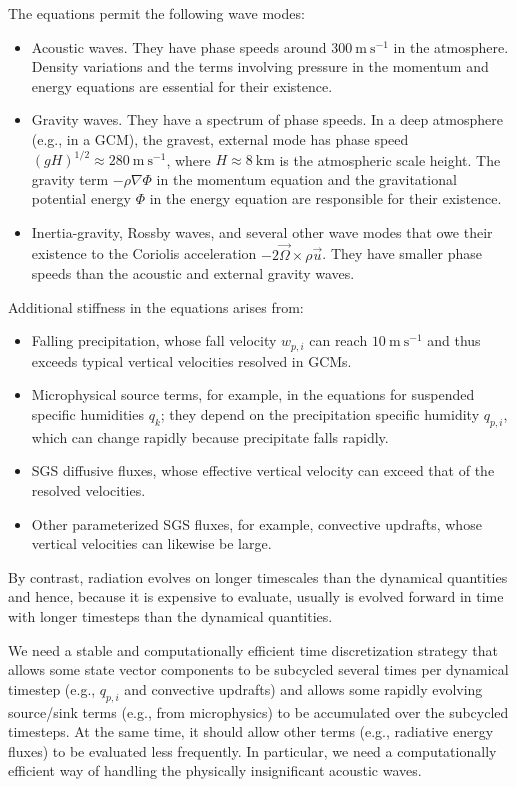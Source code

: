 \documentclass{report}
\numberwithin{equation}{section}
\begin{document}
The equations permit the following wave modes:
\begin{itemize}
    \item Acoustic waves. They have phase speeds around $300~\mathrm{m~s^{-1}}$ in the atmosphere. Density variations and the terms involving pressure in the momentum and energy equations are essential for their existence.
    \item Gravity waves. They have a spectrum of phase speeds. In a deep atmosphere (e.g., in a GCM), the gravest, external mode has phase speed $(gH)^{1/2} \approx 280~\mathrm{m~s^{-1}}$, where $H\approx 8~\mathrm{km}$ is the atmospheric scale height. The gravity term $-\rho \nabla \Phi$ in the momentum equation and the gravitational potential energy $\Phi$ in the energy equation are responsible for their existence.
    \item Inertia-gravity, Rossby waves, and several other wave modes that owe their existence to the Coriolis acceleration $-2\vec{\Omega} \times \rho \vec{u}$. They have smaller phase speeds than the acoustic and external gravity waves.
\end{itemize}
Additional stiffness in the equations arises from:
\begin{itemize}
    \item Falling precipitation, whose fall velocity $w_{p,i}$ can reach $10~\mathrm{m~s^{-1}}$ and thus exceeds typical vertical velocities resolved in GCMs.
    \item Microphysical source terms, for example, in the equations for suspended specific humidities $q_k$; they depend on the precipitation specific humidity $q_{p,i}$, which can change rapidly because precipitate falls rapidly. 
    \item SGS diffusive fluxes, whose effective vertical velocity can exceed that of the resolved velocities.
    \item Other parameterized SGS fluxes, for example, convective updrafts, whose vertical velocities can likewise be large.
\end{itemize}
By contrast, radiation evolves on longer timescales than the dynamical quantities and hence, because it is expensive to evaluate, usually is evolved forward in time with longer timesteps than the dynamical quantities. 

We need a stable and computationally efficient time discretization strategy that allows some state vector components to be subcycled several times per dynamical timestep (e.g., $q_{p,i}$ and convective updrafts) and allows some rapidly evolving source/sink terms (e.g., from microphysics) to be accumulated over the subcycled timesteps. At the same time, it should allow other terms (e.g., radiative energy fluxes) to be evaluated less frequently. In particular, we need a computationally efficient way of handling the physically insignificant acoustic waves.
     
\end{document}
